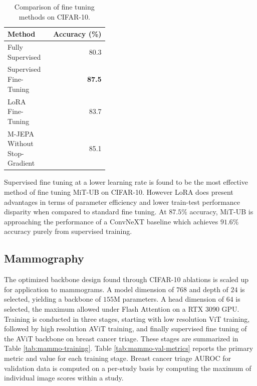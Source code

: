 \documentclass[12pt]{article}
\begin{document}
\begin{table}[H]
    \centering
    \begin{tabular}{p{0.4\linewidth}r}
        \toprule
        Method & Accuracy (\%) \\
        \midrule
        Fully Supervised & 80.3 \\
        \midrule
        Supervised Fine-Tuning & \textbf{87.5} \\
        LoRA Fine-Tuning &  83.7 \\
        M-JEPA Without Stop-Gradient & 85.1 \\
        \bottomrule
    \end{tabular}
    \caption{Comparison of fine tuning methods on CIFAR-10.}
    \label{tab:cifar10-tune-method}
\end{table}

Supervised fine tuning at a lower learning rate is found to be the most effective method of fine tuning MiT-UB on CIFAR-10. However LoRA does present advantages
in terms of parameter efficiency and lower train-test performance disparity when compared to standard fine tuning. At $87.5\%$ accuracy, MiT-UB is approaching the
performance of a ConvNeXT \cite{liu2022convnext} baseline which achieves $91.6\%$ accuracy purely from supervised training.

\subsection{Mammography}

The optimized backbone design found through CIFAR-10 ablations is scaled up for application to mammograms. A model dimension of $768$ and depth of $24$
is selected, yielding a backbone of $155\mathrm{M}$ parameters. A head dimension of $64$ is selected, the maximum allowed under Flash Attention \cite{dao2022flash}
on a RTX 3090 GPU. Training is conducted in three stages, starting with low resolution ViT training, followed by high resolution AViT training, and finally
supervised fine tuning of the AViT backbone on breast cancer triage. These stages are summarized in Table \ref{tab:mammo-training}.
Table \ref{tab:mammo-val-metrics} reports the primary metric and value for each training stage. Breast cancer triage AUROC
for validation data is computed on a per-study basis by computing the maximum of individual image scores within a study.
\end{document}
